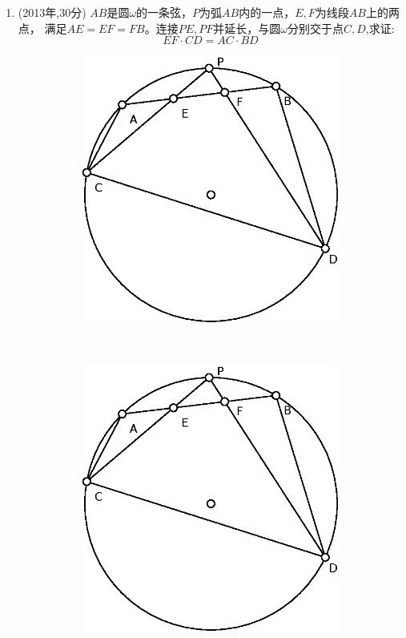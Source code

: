 \documentclass{article}
\begin{document}
\begin{enumerate}
\item (2013年,30分) $AB$是圆$\omega$的一条弦，$P$为弧$AB$内的一点，$E,F$为线段$AB$上的两点，
满足$AE=EF=FB$。连接$PE,PF$并延长，与圆$\omega$分别交于点$C,D$,求证:
\[
EF\cdot CD = AC\cdot BD
\]

    \begin{figure}[!ht]
    \centering
    \begin{subfigure}[b]{0.45\textwidth}
    \includegraphics[width=\textwidth]{China2013.eps}
    \caption{}\label{fig:p5}
    \end{subfigure}~
    \begin{subfigure}[b]{0.45\textwidth}
    \includegraphics[width=\textwidth]{China2013.eps}

\end{subfigure}
\end{figure}
\end{enumerate}
\end{document}
